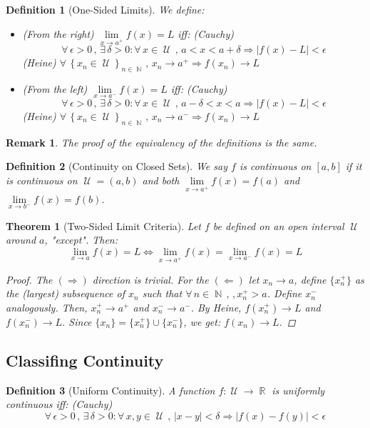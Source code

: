 \documentclass[12pt]{article}
\let\RA\Rightarrow
\let\LA\Leftarrow
\let\LR\Leftrightarrow
\newcommand{\Forall}[1]{\forall\,{#1}\,,\,}
\newcommand{\Exist}[1]{\exists\,{#1}:}
\newcommand{\seq}[2]{\left\{{#1}\right\}_{#2 \in\N}}
\DeclareMathOperator{\N}{\mathbb{N}}
\DeclareMathOperator{\R}{\mathbb{R}}
\DeclareMathOperator{\U}{\mathcal{U}}
\newtheorem{theorem}{Theorem}[subsection]
\newtheorem{definition}{Definition}[subsection]
\newtheorem{remark}{Remark}[subsection]
\begin{document}
\begin{definition}[One-Sided Limits]
  We define:
  \begin{itemize}
    \item[] (From the right) $\lim\limits_{x\to a^{+}}f(x)=L$ iff: (Cauchy) $$\Forall{\epsilon>0}\Exist{\delta>0}\Forall{x\in\U}a<x<a+\delta\RA |f(x)-L|<\epsilon$$
    (Heine) $\Forall{\seq{x_n\in\U}{n}} x_n\to a^{+} \RA f(x_n)\to L$
    \item[] (From the left) $\lim\limits_{x\to a^{-}}f(x)=L$ iff: (Cauchy) $$\Forall{\epsilon>0}\Exist{\delta>0}\Forall{x\in\U}a-\delta<x<a\RA |f(x)-L|<\epsilon$$
    (Heine) $\Forall{\seq{x_n\in\U}{n}} x_n\to a^{-} \RA f(x_n)\to L$
  \end{itemize}
\end{definition}

\begin{remark}
  The proof of the equivalency of the definitions is the same.
\end{remark}

\begin{definition}[Continuity on Closed Sets]
  We say $f$ is continuous on $[a,b]$ if it is continuous on $\U=(a,b)$ and both $\lim\limits_{x\to a^{+}}f(x)=f(a)$ and $\lim\limits_{x\to b^{-}}f(x)=f(b)$.
\end{definition}

\begin{theorem}[Two-Sided Limit Criteria]
  Let $f$ be defined on an open interval $\U$ around $a$, "except". Then:
  $$\lim\limits_{x\to a}f(x)=L\LR \lim\limits_{x\to a^{+}}f(x)=\lim\limits_{x\to a^{-}}f(x)=L$$
  \begin{proof}
    The $(\RA)$ direction is trivial. For the $(\LA)$ let $x_n\to a$, define $\{x^{+}_n\}$ as the (largest) subsequence of $x_n$ such that $\Forall{n\in\N},x^{+}_n>a$. Define $x^{-}_n$ analogously. Then, $x^{+}_n\to a^{+}$ and $x^{-}_n\to a^{-}$. By Heine, $f(x^{+}_n)\to L$ and $f(x^{-}_n)\to L$. Since $\{x_n\}=\{x^{+}_n\}\cup\{x^{-}_n\}$, we get: $f(x_n)\to L$.
  \end{proof}
\end{theorem}

\pagebreak

\subsection{Classifing Continuity}

\begin{definition}[Uniform Continuity]
  A function $f:\U\to\R$ is uniformly continuous iff: (Cauchy) $$\Forall{\epsilon>0}\Exist{\delta >0}\Forall{x,y\in\U} |x-y|<\delta \RA |f(x)-f(y)|<\epsilon$$ 
\end{definition}
\end{document}
